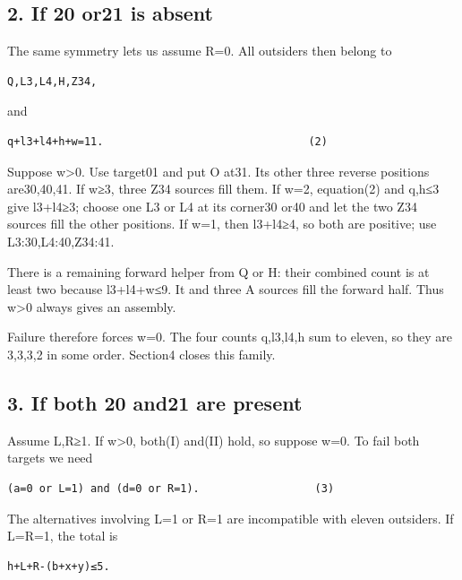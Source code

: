 \documentclass[
  10pt,
]{article}
\begin{document}
\hypertarget{if-20-or21-is-absent}{%
\subsection*{2. If 20 or21 is absent}\label{if-20-or21-is-absent}}

The same symmetry lets us assume R=0. All outsiders then belong to

\begin{verbatim}
Q,L3,L4,H,Z34,
\end{verbatim}

and

\begin{verbatim}
q+l3+l4+h+w=11.                                (2)
\end{verbatim}

Suppose w\textgreater0. Use target01 and put O at31. Its other
three reverse positions are30,40,41. If w≥3, three Z34 sources fill
them. If w=2, equation(2) and q,h≤3 give l3+l4≥3; choose one L3 or L4 at
its corner30 or40 and let the two Z34 sources fill the other positions.
If w=1, then l3+l4≥4, so both are positive; use L3:30,L4:40,Z34:41.

There is a remaining forward helper from Q or H: their combined count is
at least two because l3+l4+w≤9. It and three A sources fill the forward
half. Thus w\textgreater0 always gives an assembly.

Failure therefore forces w=0. The four counts q,l3,l4,h sum to eleven,
so they are 3,3,3,2 in some order. Section4 closes this family.

\hypertarget{if-both-20-and21-are-present}{%
\subsection*{3. If both 20 and21 are
present}\label{if-both-20-and21-are-present}}

Assume L,R≥1. If w\textgreater0, both(I) and(II) hold, so suppose w=0.
To fail both targets we need

\begin{verbatim}
(a=0 or L=1) and (d=0 or R=1).                  (3)
\end{verbatim}

The alternatives involving L=1 or R=1 are incompatible with eleven
outsiders. If L=R=1, the total is

\begin{verbatim}
h+L+R-(b+x+y)≤5.
\end{verbatim}
\end{document}
